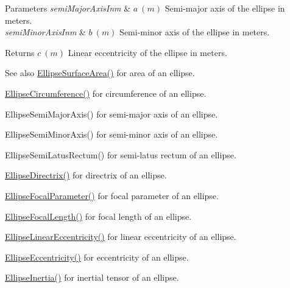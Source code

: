 \begin{DoxyParams}{Parameters}
{\em semi\+Major\+Axis\+Inm} & $ a\ (m)$ Semi-\/major axis of the ellipse in meters. \\
\hline
{\em semi\+Minor\+Axis\+Inm} & $ b\ (m)$ Semi-\/minor axis of the ellipse in meters. \\
\hline
\end{DoxyParams}
\begin{DoxyReturn}{Returns}
$ c\ (m)$ Linear eccentricity of the ellipse in meters. 
\end{DoxyReturn}
\begin{DoxySeeAlso}{See also}
\mbox{\hyperlink{group___e_g_x_math-_geometry-2_d-_ellipse-_surface_area_ga4ce8c8323e9718ce5458f4ab7f6d823d}{Ellipse\+Surface\+Area()}} for area of an ellipse. 

\mbox{\hyperlink{group___e_g_x_math-_geometry-2_d-_ellipse-_circumference_ga4172802ac674eb53467b44928ac635c7}{Ellipse\+Circumference()}} for circumference of an ellipse. 

Ellipse\+Semi\+Major\+Axis() for semi-\/major axis of an ellipse. 

Ellipse\+Semi\+Minor\+Axis() for semi-\/minor axis of an ellipse. 

Ellipse\+Semi\+Latus\+Rectum() for semi-\/latus rectum of an ellipse. 

\mbox{\hyperlink{group___e_g_x_math-_geometry-2_d-_ellipse-_directrix_gace8f72a8efbc9c18d3eb689151405106}{Ellipse\+Directrix()}} for directrix of an ellipse. 

\mbox{\hyperlink{group___e_g_x_math-_geometry-2_d-_ellipse-_focal_parameter_ga4cd01a38c72c092ef9791351948bf69b}{Ellipse\+Focal\+Parameter()}} for focal parameter of an ellipse. 

\mbox{\hyperlink{group___e_g_x_math-_geometry-2_d-_ellipse-_focal_length_gab8d63de7640c880cfecaeada6f2afdac}{Ellipse\+Focal\+Length()}} for focal length of an ellipse. 

\mbox{\hyperlink{group___e_g_x_math-_geometry-2_d-_ellipse-_linear_eccentricity_gac70b3010e30aa8b73deb50fe2b9b9a91}{Ellipse\+Linear\+Eccentricity()}} for linear eccentricity of an ellipse. 

\mbox{\hyperlink{group___e_g_x_math-_geometry-2_d-_ellipse-_eccentricity_ga6a0a7fba17f782616894cfc447628c33}{Ellipse\+Eccentricity()}} for eccentricity of an ellipse. 

\mbox{\hyperlink{group___e_g_x_math-_geometry-2_d-_ellipse-_inertia_ga10a3049c2f04b50f271fb01dc62e4cf8}{Ellipse\+Inertia()}} for inertial tensor of an ellipse. 
\end{DoxySeeAlso}
